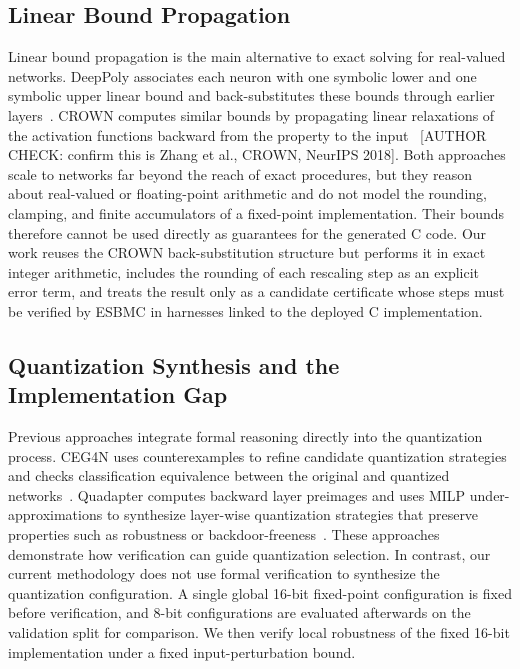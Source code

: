 \subsection{Linear Bound Propagation}

Linear bound propagation is the main alternative to exact solving for real-valued networks. DeepPoly associates each neuron with one symbolic lower and one symbolic upper linear bound and back-substitutes these bounds through earlier layers~\cite{Singh2019DeepPoly}. CROWN computes similar bounds by propagating linear relaxations of the activation functions backward from the property to the input~\cite{3327345.3327402} [AUTHOR CHECK: confirm this is Zhang et al., CROWN, NeurIPS 2018]. Both approaches scale to networks far beyond the reach of exact procedures, but they reason about real-valued or floating-point arithmetic and do not model the rounding, clamping, and finite accumulators of a fixed-point implementation. Their bounds therefore cannot be used directly as guarantees for the generated C code. Our work reuses the CROWN back-substitution structure but performs it in exact integer arithmetic, includes the rounding of each rescaling step as an explicit error term, and treats the result only as a candidate certificate whose steps must be verified by ESBMC in harnesses linked to the deployed C implementation.


\subsection{Quantization Synthesis and the Implementation Gap}
Previous approaches integrate formal reasoning directly into the quantization process. CEG4N uses counterexamples to refine candidate quantization strategies and checks classification equivalence between the original and quantized networks~\cite{Matos2022CEG4N}. Quadapter computes backward layer preimages and uses MILP under-approximations to synthesize layer-wise quantization strategies that preserve properties such as robustness or backdoor-freeness~\cite{Zhang2024Quadapter}. These approaches demonstrate how verification can guide quantization selection. In contrast, our current methodology does not use formal verification to synthesize the quantization configuration. A single global 16-bit fixed-point configuration is fixed before verification, and 8-bit configurations are evaluated afterwards on the validation split for comparison. We then verify local robustness of the fixed 16-bit implementation under a fixed input-perturbation bound.



